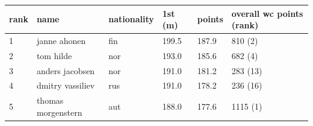 \documentclass{article}
\begin{document}
\begin{tabular}{llllll}
\toprule
rank & name & nationality & 1st (m) & points & overall wc points (rank) \\
\midrule
1 & janne ahonen & fin & 199.5 & 187.9 & 810 (2) \\
2 & tom hilde & nor & 193.0 & 185.6 & 682 (4) \\
3 & anders jacobsen & nor & 191.0 & 181.2 & 283 (13) \\
4 & dmitry vassiliev & rus & 191.0 & 178.2 & 236 (16) \\
5 & thomas morgenstern & aut & 188.0 & 177.6 & 1115 (1) \\
\bottomrule
\end{tabular}
\end{document}
